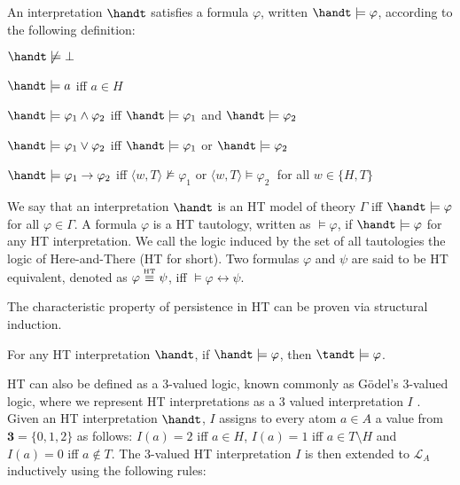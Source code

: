 \begin{definition}[HT satisfaction]
    An interpretation $\handt$ satisfies a formula $\varphi$, written $\handt \models \varphi$, according to the following definition:
    \begin{description}
        \item $\handt \not \models \bot$
        \item $\handt \models a$ iff $a\in H$
        \item $\handt \models \varphi_1 \wedge \varphi_2$ iff $\handt \models \varphi_1$ and  $\handt \models \varphi_2$
        \item $\handt \models \varphi_1 \vee \varphi_2$ iff $\handt \models \varphi_1$ or  $\handt \models \varphi_2$
        \item $\handt \models \varphi_1 \to \varphi_2$ iff $\langle w,T \rangle \not \models \varphi_1$ or  $\langle w,T \rangle \models \varphi_2\;$ for all 
        $w \in \{H,T\}$
    \end{description}
\end{definition}

We say that an interpretation $\handt$ is an HT model of theory
$\Gamma$ iff $\handt \models \varphi$ for all $\varphi \in \Gamma$. A
formula $\varphi$ is a HT tautology, written as $\models \varphi$, if
$\handt \models \varphi$ for any HT interpretation. We call the logic
induced by the set of all tautologies the logic of Here-and-There (HT
for short). Two formulas $\varphi$ and $\psi$ are said to be HT
equivalent, denoted as $\varphi \stackrel{\normalfont\mbox{\tiny HT}}{\equiv} \psi$, iff
$\models \varphi \leftrightarrow \psi$.

The characteristic property of persistence in HT can be proven via
structural induction.

\begin{proposition}[Persistence]
  For any HT interpretation $\handt$, if $\handt \models \varphi$,
  then $\tandt \models \varphi$.
\end{proposition}

HT can also be defined as a 3-valued logic, known commonly as Gödel's
3-valued logic, where we represent HT interpretations as a 3 valued
interpretation $I$ \cite{capeva05a}. Given an HT interpretation
$\handt$, $I$ assigns to every atom $a\in A$ a value from
$\textbf{3}=\{ 0, 1, 2 \}$ as follows: $I(a)=2$ iff $a \in H$,
$I(a)=1$ iff $a \in T \setminus H$ and $I(a)=0$ iff $a \not\in T$. The
3-valued HT interpretation $I$ is then extended to $\mathcal{L}_A$
inductively using the following rules:

